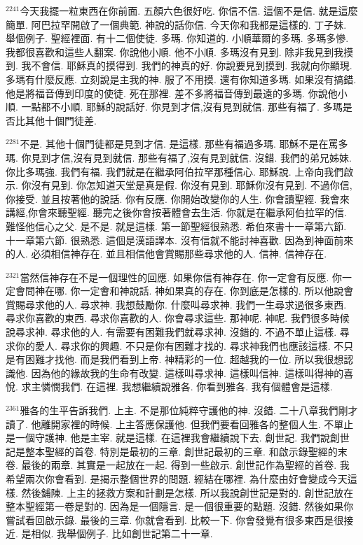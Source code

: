 \documentclass{book}
\begin{document}
$^{2241}$今天我擺一粒東西在你前面.
五顏六色很好吃.
你信不信.
這個不是信.
就是這麼簡單.
阿巴拉罕開啟了一個典範.
神說的話你信.
今天你和我都是這樣的.
丁子妹.
舉個例子.
聖經裡面.
有十二個使徒.
多瑪.
你知道的.
小順華爾的多瑪.
多瑪多慘.
我都很喜歡和這些人翻案.
你說他小順.
他不小順.
多瑪沒有見到.
除非我見到我摸到.
我不會信.
耶穌真的摸得到.
我們的神真的好.
你說要見到摸到.
我就向你顯現.
多瑪有什麼反應.
立刻說是主我的神.
服了不用摸.
還有你知道多瑪.
如果沒有搞錯.
他是將福音傳到印度的使徒.
死在那裡.
差不多將福音傳到最遠的多瑪.
你說他小順.
一點都不小順.
耶穌的說話好.
你見到才信,沒有見到就信.
那些有福了.
多瑪是否比其他十個門徒差.

$^{2281}$不是.
其他十個門徒都是見到才信.
是這樣.
那些有福過多瑪.
耶穌不是在罵多瑪.
你見到才信,沒有見到就信.
那些有福了,沒有見到就信.
沒錯.
我們的弟兄姊妹.
你比多瑪強.
我們有福.
我們就是在繼承阿伯拉罕那種信心.
耶穌說.
上帝向我們啟示.
你沒有見到.
你怎知道天堂是真是假.
你沒有見到.
耶穌你沒有見到.
不過你信,你接受.
並且按著他的說話.
你有反應.
你開始改變你的人生.
你會讀聖經.
我會來講經,你會來聽聖經.
聽完之後你會按著體會去生活.
你就是在繼承阿伯拉罕的信.
難怪他信心之父.
是不是.
就是這樣.
第一節聖經很熟悉.
希伯來書十一章第六節.
十一章第六節.
很熟悉.
這個是漢語譯本.
沒有信就不能討神喜歡.
因為到神面前來的人.
必須相信神存在.
並且相信他會賞賜那些尋求他的人.
信神.
信神存在.

$^{2321}$當然信神存在不是一個理性的回應.
如果你信有神存在.
你一定會有反應.
你一定會問神在哪.
你一定會和神說話.
神如果真的存在.
你到底是怎樣的.
所以他說會賞賜尋求他的人.
尋求神.
我想鼓勵你.
什麼叫尋求神.
我們一生尋求過很多東西.
尋求你喜歡的東西.
尋求你喜歡的人.
你會尋求這些.
那神呢.
神呢.
我們很多時候說尋求神.
尋求他的人.
有需要有困難我們就尋求神.
沒錯的.
不過不單止這樣.
尋求你的愛人.
尋求你的興趣.
不只是你有困難才找的.
尋求神我們也應該這樣.
不只是有困難才找他.
而是我們看到上帝.
神精彩的一位.
超越我的一位.
所以我很想認識他.
因為他的緣故我的生命有改變.
這樣叫尋求神.
這樣叫信神.
這樣叫得神的喜悅.
求主憐憫我們.
在這裡.
我想繼續說雅各.
你看到雅各.
我有個體會是這樣.

$^{2361}$雅各的生平告訴我們.
上主.
不是那位純粹守護他的神.
沒錯.
二十八章我們剛才讀了.
他離開家裡的時候.
上主答應保護他.
但我們要看回雅各的整個人生.
不單止是一個守護神.
他是主宰.
就是這樣.
在這裡我會繼續說下去.
創世記.
我們說創世記是整本聖經的首卷.
特別是最初的三章.
創世記最初的三章.
和啟示錄聖經的末卷.
最後的兩章.
其實是一起放在一起.
得到一些啟示.
創世記作為聖經的首卷.
我希望兩次你會看到.
是揭示整個世界的問題.
經結在哪裡.
為什麼由好會變成今天這樣.
然後鋪陳.
上主的拯救方案和計劃是怎樣.
所以我說創世記是對的.
創世記放在整本聖經第一卷是對的.
因為是一個隱言.
是一個很重要的點題.
沒錯.
然後如果你嘗試看回啟示錄.
最後的三章.
你就會看到.
比較一下.
你會發覺有很多東西是很接近.
是相似.
我舉個例子.
比如創世記第二十一章.
\end{document}
